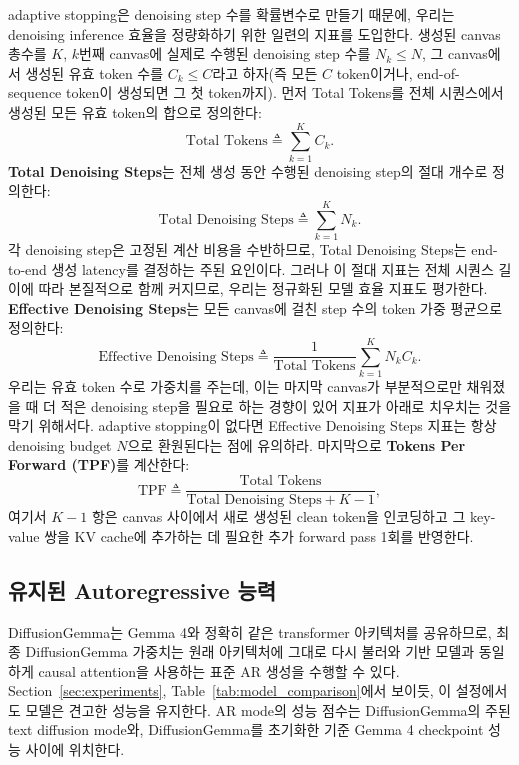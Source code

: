 \documentclass[11pt, a4paper, logo, copyright, gdm]{google}
\begin{document}
adaptive stopping은 denoising step 수를 확률변수로 만들기 때문에, 우리는 denoising inference 효율을 정량화하기 위한 일련의 지표를 도입한다. 생성된 canvas 총수를 $K$, $k$번째 canvas에 실제로 수행된 denoising step 수를 $N_k \leq N$, 그 canvas에서 생성된 유효 token 수를 $C_k \leq C$라고 하자(즉 모든 $C$ token이거나, end-of-sequence token이 생성되면 그 첫 token까지). 먼저 Total Tokens를 전체 시퀀스에서 생성된 모든 유효 token의 합으로 정의한다:
\begin{equation}\label{eq:total_tokens}
\text{Total Tokens} \triangleq \sum_{k=1}^K C_k.
\end{equation}
\textbf{Total Denoising Steps}는 전체 생성 동안 수행된 denoising step의 절대 개수로 정의한다:
\begin{equation}\label{eq:total_denoising_steps}
   \text{Total Denoising Steps} \triangleq \sum_{k=1}^{K} N_k.
\end{equation}
각 denoising step은 고정된 계산 비용을 수반하므로, Total Denoising Steps는 end-to-end 생성 latency를 결정하는 주된 요인이다. 그러나 이 절대 지표는 전체 시퀀스 길이에 따라 본질적으로 함께 커지므로, 우리는 정규화된 모델 효율 지표도 평가한다. \textbf{Effective Denoising Steps}는 모든 canvas에 걸친 step 수의 token 가중 평균으로 정의한다:
\begin{equation}\label{eq:effective_denoising_steps}
   \text{Effective Denoising Steps} \triangleq \frac{1}{\text{Total Tokens}} \sum_{k=1}^K N_k C_k.
\end{equation}
우리는 유효 token 수로 가중치를 주는데, 이는 마지막 canvas가 부분적으로만 채워졌을 때 더 적은 denoising step을 필요로 하는 경향이 있어 지표가 아래로 치우치는 것을 막기 위해서다. adaptive stopping이 없다면 Effective Denoising Steps 지표는 항상 denoising budget $N$으로 환원된다는 점에 유의하라. 마지막으로 \textbf{Tokens Per Forward (TPF)}를 계산한다:
\begin{equation}\label{eq:tpf}
   \text{TPF} \triangleq \frac{\text{Total Tokens}}{\text{Total Denoising Steps} + K - 1},
\end{equation}
여기서 $K-1$ 항은 canvas 사이에서 새로 생성된 clean token을 인코딩하고 그 key-value 쌍을 KV cache에 추가하는 데 필요한 추가 forward pass 1회를 반영한다.

\subsection{유지된 Autoregressive 능력} \label{sec:retained_ar_capability}

DiffusionGemma는 Gemma 4와 정확히 같은 transformer 아키텍처를 공유하므로, 최종 DiffusionGemma 가중치는 원래 아키텍처에 그대로 다시 불러와 기반 모델과 동일하게 causal attention을 사용하는 표준 AR 생성을 수행할 수 있다. Section~\ref{sec:experiments}, Table~\ref{tab:model_comparison}에서 보이듯, 이 설정에서도 모델은 견고한 성능을 유지한다. AR mode의 성능 점수는 DiffusionGemma의 주된 text diffusion mode와, DiffusionGemma를 초기화한 기준 Gemma 4 checkpoint 성능 사이에 위치한다.
\end{document}
